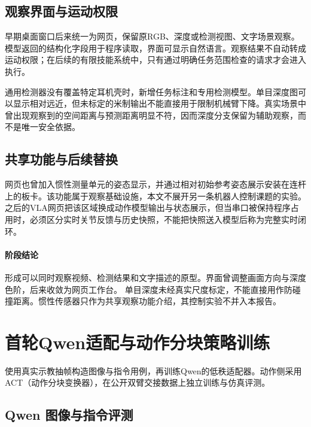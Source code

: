 \subsection{观察界面与运动权限}\label{s02-detail-2}

早期桌面窗口后来统一为网页，保留原RGB、深度或检测视图、文字场景观察。模型返回的结构化字段用于程序读取，界面可显示自然语言。观察结果不自动转成运动权限；在后续的有限技能系统中，只有通过明确任务范围检查的请求才会进入执行。

通用检测器没有覆盖特定耳机壳时，新增任务标注和专用检测模型。单目深度图可以显示相对远近，但未标定的米制输出不能直接用于限制机械臂下降。真实场景中曾出现观察到的空间距离与预测距离明显不符，因而深度分支保留为辅助观察，而不是唯一安全依据。

\subsection{共享功能与后续替换}\label{s02-detail-3}

网页也曾加入惯性测量单元的姿态显示，并通过相对初始参考姿态展示安装在连杆上的板卡。该功能属于观察基础设施，本文不展开另一条机器人控制课题的实验。之后的VLA网页把该区域换成动作模型输出与状态展示，但当串口被保持程序占用时，必须区分实时关节反馈与历史快照，不能把快照送入模型后称为完整实时闭环。



\paragraph{阶段结论}形成可以同时观察视频、检测结果和文字描述的原型。界面曾调整画面方向与深度色阶，后来收敛为网页工作台。 单目深度未经真实尺度标定，不能直接用作防碰撞距离。惯性传感器只作为共享观察功能介绍，其控制实验不并入本报告。


\FloatBarrier

\section{首轮Qwen适配与动作分块策略训练}

\label{stage:s03}

使用真实示教抽帧构造图像与指令用例，再训练Qwen的低秩适配器。动作侧采用ACT（动作分块变换器），在公开双臂交接数据上独立训练与仿真评测。

\subsection{Qwen 图像与指令评测}\label{s03-detail-1}

